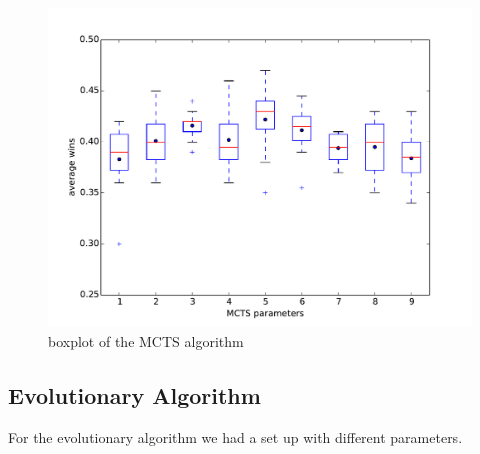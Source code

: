 \begin{figure}[H]
\centering
\includegraphics[scale=0.6]{images/eval_mcts.pdf}
\caption{boxplot of the \ac{MCTS} algorithm}
\label{fig:eval_evo}
\end{figure}


\subsection{Evolutionary Algorithm} 

For the evolutionary algorithm we had a set up with different parameters.

